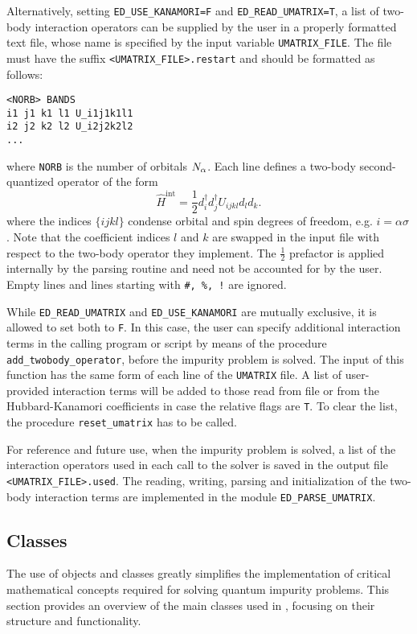 \documentclass[edipack_sp.tex]{subfiles}
\begin{document}
Alternatively, setting {\tt ED\_USE\_KANAMORI=F} and {\tt ED\_READ\_UMATRIX=T}, a list of two-body interaction operators can be supplied by the user in a properly
formatted text file, whose name is specified by the input variable {\tt UMATRIX\_FILE}.  
The file must have the suffix {\tt <UMATRIX\_FILE>.re\-star\-t} and should be formatted as follows: 
\begin{lstlisting}[style=mybash,numbers=none]
<NORB> BANDS
i1 j1 k1 l1 U_i1j1k1l1
i2 j2 k2 l2 U_i2j2k2l2
...
\end{lstlisting}
where {\tt NORB} is the number of orbitals $N_\alpha$.
Each line defines a two-body second-quantized operator of the form 
$$
\hat{H}^{\mathrm{int}}=\frac{1}{2}d^{\dagger}_{i}d^{\dagger}_{j}U_{ijkl}d_{l}d_{k}.
$$
where the indices $\{ijkl\}$ condense orbital and spin degrees of freedom, e.g. $i=\alpha\sigma$. 
Note that the coefficient indices $l$ and $k$ are swapped in the input file with respect to the two-body operator they implement. The $\tfrac{1}{2}$ prefactor is applied internally by the parsing routine and need not be accounted for by the user.
Empty lines and lines starting with {\tt \#, \%, !} are ignored.

While {\tt ED\_READ\_UMATRIX} and {\tt ED\_USE\_KANAMORI}
are mutually exclusive, it is allowed to set both to {\tt F}. 
In this case, the user can specify additional interaction terms in the calling program or script by means of the procedure {\tt add\_twobody\_operator}, before the impurity problem is solved. The input of this function has the same form of each line of the {\tt UMATRIX} file. 
A list of user-provided interaction terms will be added to those read from file or from the Hubbard-Kanamori coefficients in case the relative flags are {\tt T}. To clear the list, the procedure {\tt reset\_umatrix} has to be called.

For reference and future use, when the impurity problem is solved, a list of the interaction operators used in each call to the solver is saved in the output file 
{\tt <UMATRIX\_FILE>.used}.
The reading, writing, parsing and initialization of the two-body interaction terms are implemented in the module {\tt ED\_PARSE\_UMATRIX}.
















\subsection{Classes}
The use of objects and classes greatly simplifies the implementation of critical mathematical concepts required for solving quantum 
impurity problems. This section provides an overview of the main 
classes used in \NAME, focusing on their structure and functionality.
\end{document}
